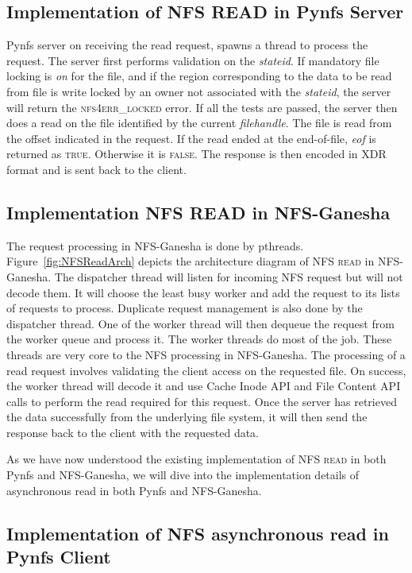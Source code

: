 \subsection{Implementation of NFS READ in Pynfs Server}
Pynfs server on receiving the read request, spawns a thread to process the request. The server first performs validation on the \textit{stateid}. If mandatory file locking is \textit{on} for the file, and if the region corresponding to the data to be read from file is write locked by an owner not associated with the \textit{stateid}, the server will return the \textsc{nfs4err\_locked} error. If all the tests are passed, the server then does a read on the file identified by the current \textit{filehandle}. The file is read from the offset indicated in the request.  If the read ended at the end-of-file, \textit{eof} is returned as  \textsc{true}. Otherwise it is \textsc{false}. The response is then encoded in XDR format and is sent back to the client.
	
\subsection{Implementation NFS READ in NFS-Ganesha}

 The request processing in NFS-Ganesha is done by pthreads. Figure~\ref{fig:NFSReadArch} depicts the architecture diagram of \textsc{NFS read} in NFS-Ganesha. The dispatcher thread will listen for incoming NFS request but will not decode them. It will choose the least busy worker and add the request to its lists of requests to process. Duplicate request management is also done by the dispatcher thread. One of the worker thread will then dequeue the request from the worker queue and process it. The worker threads do most of the job. These threads are very core to the NFS processing in NFS-Ganesha. The processing of a read request involves validating the client access on the requested file. On success, the worker thread will decode it and use Cache Inode API and File Content API calls to perform the read required for this request. Once the server has retrieved the data successfully from the underlying file system, it will then send the response back to the client with the requested data.
  
  As we have now understood the existing implementation of \textsc{NFS read} in both Pynfs and NFS-Ganesha, we will dive into the implementation details of asynchronous read in both Pynfs and NFS-Ganesha.

\subsection{Implementation of NFS asynchronous read in Pynfs Client}
 
